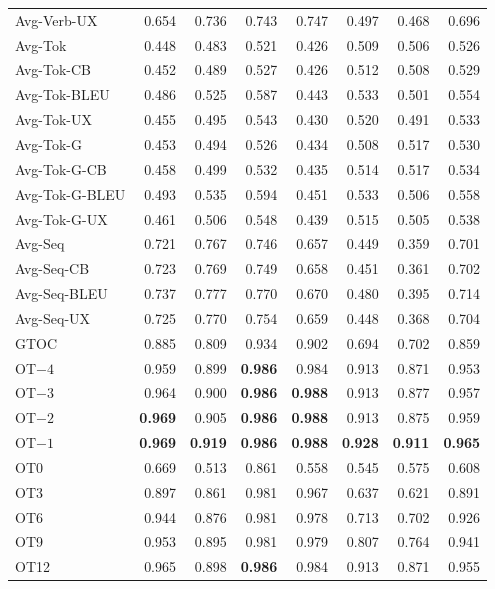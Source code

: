 {\begin{table}[t]
\begin{tabular}{@{}lrrrrrrr@{}}
Avg-Verb-UX & 0.654 & 0.736 & 0.743 & 0.747 & 0.497 & 0.468 & 0.696 \\
\addlinespace
Avg-Tok & 0.448 & 0.483 & 0.521 & 0.426 & 0.509 & 0.506 & 0.526 \\
Avg-Tok-CB & 0.452 & 0.489 & 0.527 & 0.426 & 0.512 & 0.508 & 0.529 \\
Avg-Tok-BLEU & 0.486 & 0.525 & 0.587 & 0.443 & 0.533 & 0.501 & 0.554 \\
Avg-Tok-UX & 0.455 & 0.495 & 0.543 & 0.430 & 0.520 & 0.491 & 0.533 \\
Avg-Tok-G & 0.453 & 0.494 & 0.526 & 0.434 & 0.508 & 0.517 & 0.530 \\
Avg-Tok-G-CB & 0.458 & 0.499 & 0.532 & 0.435 & 0.514 & 0.517 & 0.534 \\
Avg-Tok-G-BLEU & 0.493 & 0.535 & 0.594 & 0.451 & 0.533 & 0.506 & 0.558 \\
Avg-Tok-G-UX & 0.461 & 0.506 & 0.548 & 0.439 & 0.515 & 0.505 & 0.538 \\
\addlinespace
Avg-Seq & 0.721 & 0.767 & 0.746 & 0.657 & 0.449 & 0.359 & 0.701 \\
Avg-Seq-CB & 0.723 & 0.769 & 0.749 & 0.658 & 0.451 & 0.361 & 0.702 \\
Avg-Seq-BLEU & 0.737 & 0.777 & 0.770 & 0.670 & 0.480 & 0.395 & 0.714 \\
Avg-Seq-UX & 0.725 & 0.770 & 0.754 & 0.659 & 0.448 & 0.368 & 0.704 \\
\addlinespace
GTOC & 0.885 & 0.809 & 0.934 & 0.902 & 0.694 & 0.702 & 0.859 \\
\addlinespace
OT$-4$ & 0.959 & 0.899 & \textbf{0.986} & 0.984 & 0.913 & 0.871 & 0.953 \\
OT$-3$ & 0.964 & 0.900 & \textbf{0.986} & \textbf{0.988} & 0.913 & 0.877 & 0.957 \\
OT$-2$ & \textbf{0.969} & 0.905 & \textbf{0.986} & \textbf{0.988} & 0.913 & 0.875 & 0.959 \\
OT$-1$ & \textbf{0.969} & \textbf{0.919} & \textbf{0.986} & \textbf{0.988} & \textbf{0.928} & \textbf{0.911} & \textbf{0.965} \\
OT0 & 0.669 & 0.513 & 0.861 & 0.558 & 0.545 & 0.575 & 0.608 \\
OT3 & 0.897 & 0.861 & 0.981 & 0.967 & 0.637 & 0.621 & 0.891 \\
OT6 & 0.944 & 0.876 & 0.981 & 0.978 & 0.713 & 0.702 & 0.926 \\
OT9 & 0.953 & 0.895 & 0.981 & 0.979 & 0.807 & 0.764 & 0.941 \\
OT12 & 0.965 & 0.898 & \textbf{0.986} & 0.984 & 0.913 & 0.871 & 0.955 \\
\bottomrule
\end{tabular}
\end{table}
}

